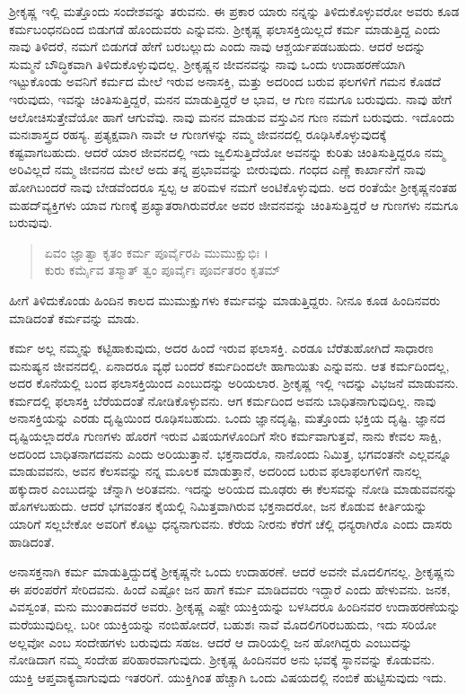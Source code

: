 ಶ್ರೀಕೃಷ್ಣ ಇಲ್ಲಿ ಮತ್ತೊಂದು ಸಂದೇಶವನ್ನು ತರುವನು. ಈ ಪ್ರಕಾರ ಯಾರು ನನ್ನನ್ನು ತಿಳಿದುಕೊಳ್ಳುವರೋ ಅವರು ಕೂಡ ಕರ್ಮಬಂಧನದಿಂದ ಬಿಡುಗಡೆ ಹೊಂದುವರು ಎನ್ನುವನು. ಶ್ರೀಕೃಷ್ಣ ಫಲಾಸಕ್ತಿಯಿಲ್ಲದೆ ಕರ್ಮ ಮಾಡುತ್ತಿದ್ದ ಎಂದು ನಾವು ತಿಳಿದರೆ, ನಮಗೆ ಬಿಡುಗಡೆ ಹೇಗೆ ಬರಬಲ್ಲುದು ಎಂದು ನಾವು ಆಶ್ಚರ್ಯಪಡಬಹುದು. ಆದರೆ ಅದನ್ನು ಸುಮ್ಮನೆ ಬೌದ್ಧಿಕವಾಗಿ ತಿಳಿದುಕೊಳ್ಳುವುದಲ್ಲ. ಶ್ರೀಕೃಷ್ಣನ ಜೀವನವನ್ನು ನಾವು ಒಂದು ಉದಾಹರಣೆಯಾಗಿ ಇಟ್ಟುಕೊಂಡು ಅವನಿಗೆ ಕರ್ಮದ ಮೇಲೆ ಇರುವ ಅನಾಸಕ್ತಿ, ಮತ್ತು ಅದರಿಂದ ಬರುವ ಫಲಗಳಿಗೆ ಗಮನ ಕೊಡದೆ ಇರುವುದು, ಇವನ್ನು ಚಿಂತಿಸುತ್ತಿದ್ದರೆ, ಮನನ ಮಾಡುತ್ತಿದ್ದರೆ ಆ ಭಾವ, ಆ ಗುಣ ನಮಗೂ ಬರುವುದು. ನಾವು ಹೇಗೆ ಆಲೋಚಿಸುತ್ತೇವೆಯೋ ಹಾಗೆ ಆಗುವೆವು. ನಾವು ಮನನ ಮಾಡುವ ವಸ್ತುವಿನ ಗುಣ ನಮಗೆ ಬರುವುದು. ಇದೊಂದು ಮನಃಶಾಸ್ತ್ರದ ರಹಸ್ಯ. ಪ್ರತ್ಯಕ್ಷವಾಗಿ ನಾವೇ ಆ ಗುಣಗಳನ್ನು ನಮ್ಮ ಜೀವನದಲ್ಲಿ ರೂಢಿಸಿಕೊಳ್ಳುವುದಕ್ಕೆ ಕಷ್ಟವಾಗಬಹುದು. ಆದರೆ ಯಾರ ಜೀವನದಲ್ಲಿ ಇದು ಜ್ವಲಿಸುತ್ತಿದೆಯೋ ಅವನನ್ನು ಕುರಿತು ಚಿಂತಿಸುತ್ತಿದ್ದರೂ ನಮ್ಮ ಅರಿವಿಲ್ಲದೆ ನಮ್ಮ ಜೀವನದ ಮೇಲೆ ಅದು ತನ್ನ ಪ್ರಭಾವವನ್ನು ಬೀರುವುದು. ಗಂಧದ ಎಣ್ಣೆ ಕಾರ್ಖಾನೆಗೆ ನಾವು ಹೋಗಿಬಂದರೆ ನಾವು ಬೇಡವೆಂದರೂ ಸ್ವಲ್ಪ ಆ ಪರಿಮಳ ನಮಗೆ ಅಂಟಿಕೊಳ್ಳುವುದು. ಅದ ರಂತೆಯೇ ಶ್ರೀಕೃಷ್ಣನಂತಹ ಮಹದ್​ವ್ಯಕ್ತಿಗಳು ಯಾವ ಗುಣಕ್ಕೆ ಪ್ರಖ್ಯಾತರಾಗಿರುವರೋ ಅವರ ಜೀವನವನ್ನು ಚಿಂತಿಸುತ್ತಿದ್ದರೆ ಆ ಗುಣಗಳು ನಮಗೂ ಬರುವುವು.

\begin{verse}
ಏವಂ ಜ್ಞಾತ್ವಾ ಕೃತಂ ಕರ್ಮ ಪೂರ್ವೈರಪಿ ಮುಮುಕ್ಷುಭಿಃ ।\\ಕುರು ಕರ್ಮೈವ ತಸ್ಮಾತ್ ತ್ವಂ ಪೂರ್ವೈಃ ಪೂರ್ವತರಂ ಕೃತಮ್ 
\end{verse}

{\small ಹೀಗೆ ತಿಳಿದುಕೊಂಡು ಹಿಂದಿನ ಕಾಲದ ಮುಮುಕ್ಷುಗಳು ಕರ್ಮವನ್ನು ಮಾಡುತ್ತಿದ್ದರು. ನೀನೂ ಕೂಡ ಹಿಂದಿನವರು ಮಾಡಿದಂತೆ ಕರ್ಮವನ್ನು ಮಾಡು.}

ಕರ್ಮ ಅಲ್ಲ ನಮ್ಮನ್ನು ಕಟ್ಟಿಹಾಕುವುದು, ಅದರ ಹಿಂದೆ ಇರುವ ಫಲಾಸಕ್ತಿ. ಎರಡೂ ಬೆರೆತುಹೋಗಿದೆ ಸಾಧಾರಣ ಮನುಷ್ಯನ ಜೀವನದಲ್ಲಿ. ಏನಾದರೂ ವ್ಯಥೆ ಬಂದರೆ ಕರ್ಮದಿಂದಲೇ ಹಾಗಾಯಿತು ಎನ್ನುವನು. ಆತ ಕರ್ಮದಿಂದಲ್ಲ, ಅದರ ಕೊನೆಯಲ್ಲಿ ಬಂದ ಫಲಾಸಕ್ತಿಯಿಂದ ಎಂಬುದನ್ನು ಅರಿಯಲಾರ. ಶ್ರೀಕೃಷ್ಣ ಇಲ್ಲಿ ಇದನ್ನು ವಿಭಜನೆ ಮಾಡುವನು. ಕರ್ಮದಲ್ಲಿ ಫಲಾಸಕ್ತಿ ಬೆರೆಯದಂತೆ ನೋಡಿಕೊಳ್ಳುವನು. ಆಗ ಕರ್ಮದಿಂದ ಅವನು ಬಾಧಿತನಾಗುವುದಿಲ್ಲ. ನಾವು ಅನಾಸಕ್ತಿಯನ್ನು ಎರಡು ದೃಷ್ಟಿಯಿಂದ ರೂಢಿಸಬಹುದು. ಒಂದು ಜ್ಞಾನದೃಷ್ಟಿ, ಮತ್ತೊಂದು ಭಕ್ತಿಯ ದೃಷ್ಟಿ. ಜ್ಞಾನದ ದೃಷ್ಟಿಯಲ್ಲಾದರೊ ಗುಣಗಳು ಹೊರಗೆ ಇರುವ ವಿಷಯಗಳೊಂದಿಗೆ ಸೇರಿ ಕರ್ಮವಾಗುತ್ತವೆ, ನಾನು ಕೇವಲ ಸಾಕ್ಷಿ, ಅದರಿಂದ ಬಾಧಿತನಾಗದವನು ಎಂದು ಅರಿಯುತ್ತಾನೆ. ಭಕ್ತನಾದರೊ, ನಾನೊಂದು ನಿಮಿತ್ತ, ಭಗವಂತನೇ ಎಲ್ಲವನ್ನೂ ಮಾಡುವವನು, ಅವನ ಕೆಲಸವನ್ನು ನನ್ನ ಮೂಲಕ ಮಾಡುತ್ತಾನೆ, ಅದರಿಂದ ಬರುವ ಫಲಾಫಲಗಳಿಗೆ ನಾನಲ್ಲ ಹಕ್ಕುದಾರ ಎಂಬುದನ್ನು ಚೆನ್ನಾಗಿ ಅರಿತವನು. ಇದನ್ನು ಅರಿಯದ ಮೂಢರು ಈ ಕೆಲಸವನ್ನು ನೋಡಿ ಮಾಡುವವನನ್ನು ಹೊಗಳಬಹುದು. ಆದರೆ ಭಗವಂತನ ಕೈಯಲ್ಲಿ ನಿಮಿತ್ತವಾಗಿರುವ ಭಕ್ತನಾದರೋ, ಜನ ಕೊಡುವ ಕೀರ್ತಿಯನ್ನು ಯಾರಿಗೆ ಸಲ್ಲಬೇಕೋ ಅವರಿಗೆ ಕೊಟ್ಟು ಧನ್ಯನಾಗುವನು. ಕೆರೆಯ ನೀರನು ಕೆರೆಗೆ ಚೆಲ್ಲಿ ಧನ್ಯರಾಗಿರೊ ಎಂದು ದಾಸರು ಹಾಡಿದಂತೆ.

ಅನಾಸಕ್ತನಾಗಿ ಕರ್ಮ ಮಾಡುತ್ತಿದ್ದುದಕ್ಕೆ ಶ್ರೀಕೃಷ್ಣನೇ ಒಂದು ಉದಾಹರಣೆ. ಆದರೆ ಅವನೇ ಮೊದಲಿಗನಲ್ಲ. ಶ್ರೀಕೃಷ್ಣನು ಈ ಪರಂಪರೆಗೆ ಸೇರಿದವನು. ಹಿಂದೆ ಎಷ್ಟೋ ಜನ ಹಾಗೆ ಕರ್ಮ ಮಾಡಿದವರು ಇದ್ದಾರೆ ಎಂದು ಹೇಳುವನು. ಜನಕ, ವಿವಸ್ವಂತ, ಮನು ಮುಂತಾದವರೆ ಅವರು. ಶ್ರೀಕೃಷ್ಣ ಎಷ್ಟೇ ಯುಕ್ತಿಯನ್ನು ಬಳಸಿದರೂ ಹಿಂದಿನವರ ಉದಾಹರಣೆಯನ್ನು ಮರೆಯುವುದಿಲ್ಲ. ಬರೀ ಯುಕ್ತಿಯನ್ನು ನಂಬಿಹೋದರೆ, ಬಹುಶಃ ನಾವೆ ಮೊದಲಿಗರಿರಬಹುದು, ಇದು ಸರಿಯೋ ಅಲ್ಲವೋ ಎಂಬ ಸಂದೇಹಗಳು ಬರುವುದು ಸಹಜ. ಆದರೆ ಆ ದಾರಿಯಲ್ಲಿ ಜನ ಹೋಗಿದ್ದರು ಎಂಬುದನ್ನು ನೋಡಿದಾಗ ನಮ್ಮ ಸಂದೇಹ ಪರಿಹಾರವಾಗುವುದು. ಶ್ರೀಕೃಷ್ಣ ಹಿಂದಿನವರ ಅನು ಭವಕ್ಕೆ ಸ್ಥಾನವನ್ನು ಕೊಡುವನು. ಯುಕ್ತಿ ಆಪ್ತವಾಕ್ಯವಾಗುವುದು ಇತರರಿಗೆ. ಯುಕ್ತಿಗಿಂತ ಹೆಚ್ಚಾಗಿ ಒಂದು ವಿಷಯದಲ್ಲಿ ನಂಬಿಕೆ ಹುಟ್ಟಿಸುವುದು ಇದು.

